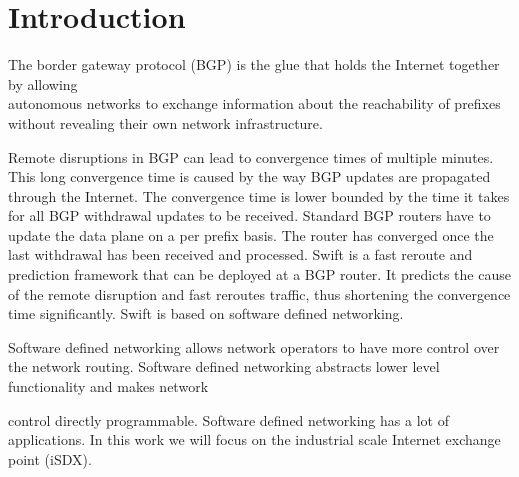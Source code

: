 

\chapter{\label{introduction}Introduction}
The border gateway protocol (BGP) is the glue that holds the Internet together by allowing \\
autonomous networks to exchange information about the reachability of prefixes without revealing their own network infrastructure. 

Remote disruptions in BGP can lead to convergence times of multiple minutes. This long convergence time is caused by the way BGP updates are propagated through the Internet. The convergence time is lower bounded by the time it takes for all BGP withdrawal updates to be received. Standard BGP routers have to update the data plane on a per prefix basis. The router has converged once the last withdrawal has been received and processed. Swift is a fast reroute and prediction framework that can be deployed at a BGP router. It predicts the cause of the remote disruption and fast reroutes traffic, thus shortening the convergence time significantly. Swift is based on software defined networking. 

Software defined networking allows network operators to have more control over the network routing. Software defined networking abstracts lower level functionality and makes network

control directly programmable. Software defined networking has a lot of applications. In this work we will focus on the industrial scale Internet exchange point (iSDX). 

